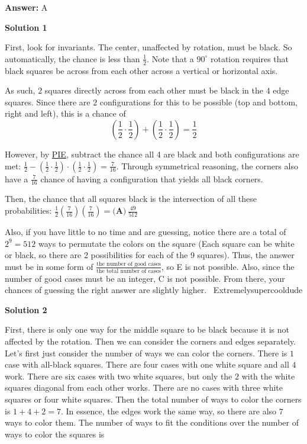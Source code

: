 \begin{enumerate}
 \textbf{Answer: }A



\textbf{Solution 1}

First, look for invariants. The center, unaffected by rotation, must be black. So automatically, the chance is less than $\frac{1}{2}.$ Note that a $90^{\circ}$ rotation requires that black squares be across from each other across a vertical or horizontal axis. 

 
As such, $2$ squares directly across from each other must be black in the $4$ edge squares. Since there are $2$ configurations for this to be possible (top and bottom, right and left), this is a chance of
 \[\left (\frac{1}{2} \cdot \frac{1}{2} \right )+ \left (\frac{1}{2} \cdot \frac{1}{2} \right )=\frac{1}{2}\] 

 
However, by \href{https://artofproblemsolving.com/wiki/index.php?title=PIE}{PIE}, subtract the chance all 4 are black and both configurations are met: $\frac{1}{2}- \left (\frac{1}{2} \cdot \frac{1}{2} \right ) \cdot \left (\frac{1}{2} \cdot \frac{1}{2} \right )=\frac{7}{16}$. Through symmetrical reasoning, the corners also have a $\frac{7}{16}$ chance of having a configuration that yields all black corners. 

 Then, the chance that all squares black is the intersection of all these probabilities: $\frac{1}{2} \left (\frac{7}{16} \right ) \left (\frac{7}{16} \right ) = \boxed{\textbf{(A)}\ \frac{49}{512}}$ 

 


 Also, if you have little to no time and are guessing, notice there are a total of $2^9 = 512$ ways to permutate the colors on the square (Each square can be white or black, so there are 2 possibilities for each of the 9 squares). Thus, the answer must be in some form of $\frac{\text{the number of good cases}}{\text{the total number of cases}}$, so E is not possible. Also, since the number of good cases must be an integer, C is not possible. From there, your chances of guessing the right answer are slightly higher. ~Extremelysupercooldude

 



\textbf{Solution 2}

First, there is only one way for the middle square to be black because it is not affected by the rotation. Then we can consider the corners and edges separately. Let's first just consider the number of ways we can color the corners. There is $1$ case with all-black squares. There are four cases with one white square and all $4$ work. There are six cases with two white squares, but only the $2$ with the white squares diagonal from each other works. There are no cases with three white squares or four white squares. Then the total number of ways to color the corners is $1+4+2=7$. In essence, the edges work the same way, so there are also $7$ ways to color them. The number of ways to fit the conditions over the number of ways to color the squares is


\end{enumerate}
